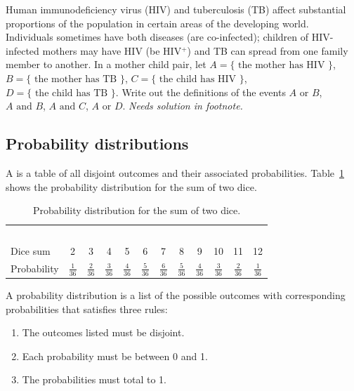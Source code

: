 \begin{exercise}
Human immunodeficiency virus (HIV) and tuberculosis (TB) affect substantial proportions of the population in certain areas of the developing world. Individuals sometimes have both diseases (are co-infected); children of HIV-infected mothers may have HIV (be HIV$^+$) and TB can spread from one family member to another.  In a mother child pair, let $A = \{\text{ the mother has HIV } \}$,  $B = \{\textrm{ the mother has TB } \}$, $C = \{\text{ the child has HIV } \}$,  $D = \{\text{ the child has TB } \}$.  Write out the definitions of the events $A \text{ or } B$, $A \text{ and } B$, $A \text{ and } C$, $A \text{ or } D$. \textit{Needs solution in footnote.}

\end{exercise}

\subsection{Probability distributions}

A  is a table of all disjoint outcomes and their associated probabilities. Table~\ref{diceProb} shows the probability distribution for the sum of two dice. 

\begin{table}[h] \small
\centering
\begin{tabular}{l ccc ccc ccc cc}
  \hline
  \ \vspace{-3mm} \\
Dice sum\vspace{0.3mm} & 2 & 3 & 4 & 5 & 6 & 7 & 8 & 9 & 10 & 11 & 12  \\
Probability & $\frac{1}{36}$ & $\frac{2}{36}$ & $\frac{3}{36}$ & $\frac{4}{36}$ & $\frac{5}{36}$ & $\frac{6}{36}$ & $\frac{5}{36}$ & $\frac{4}{36}$ & $\frac{3}{36}$ & $\frac{2}{36}$ & $\frac{1}{36}$\vspace{1mm} \\
   \hline
\end{tabular}
\caption{Probability distribution for the sum of two dice.}
\label{diceProb}
\end{table}

\begin{termBox}{
A probability distribution is a list of the possible outcomes with corresponding probabilities that satisfies three rules: \vspace{-2mm}
\begin{enumerate}
\setlength{\itemsep}{0mm}
\item The outcomes listed must be disjoint.
\item Each probability must be between 0 and 1.
\item The probabilities must total to 1. \vspace{1mm}
\end{enumerate}}
\end{termBox}

